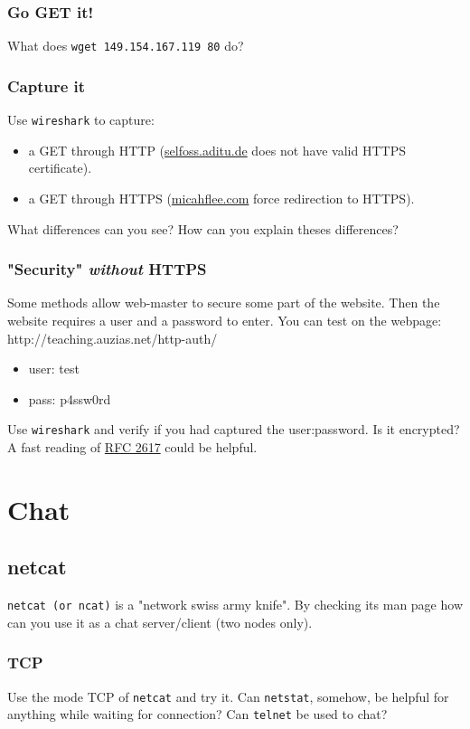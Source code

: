 \documentclass[11pt]{article}
\begin{document}
\subsubsection{Go GET it!}
What does \verb"wget 149.154.167.119 80" do?

\subsubsection{Capture it}
Use \verb"wireshark" to capture:
\begin{itemize}
  \item a GET through HTTP (\color{blue}\href{http://selfoss.aditu.de/}{selfoss.aditu.de}\color{black} does not have valid HTTPS certificate).
  \item a GET through HTTPS (\color{blue}\href{https://micahflee.com/}{micahflee.com}\color{black} force redirection to HTTPS).
\end{itemize}
What differences can you see? How can you explain theses differences?

\subsubsection{"Security" \emph{without} HTTPS}
Some methods allow web-master to secure some part of the website. Then the website requires a user and a password to enter. You can test on the webpage: http://teaching.auzias.net/http-auth/
\begin{itemize}
  \item user: test
  \item pass: p4ssw0rd
\end{itemize}
Use \verb"wireshark" and verify if you had captured the user:password. Is it encrypted? A fast reading of \color{blue}\href{http://tools.ietf.org/html/rfc2617}{RFC 2617}\color{black} could be helpful.

\section{Chat}
\subsection{netcat}
\verb"netcat (or ncat)" is a "network swiss army knife". By checking its man page how can you use it as a chat server/client (two nodes only).
\subsubsection{TCP}
Use the mode TCP of \verb"netcat" and try it. Can \verb"netstat", somehow, be helpful for anything while waiting for connection? Can \verb"telnet" be used to chat?
\end{document}
